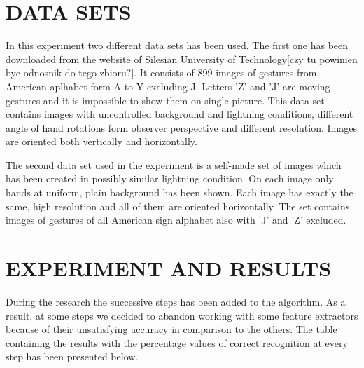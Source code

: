 \documentclass[11pt,a4paper]{article}
\begin{document}
\section{DATA SETS}

	In this experiment two different data sets has been used. The first one has been downloaded from the website of Silesian University of Technology[czy tu powinien byc odnosnik do tego zbioru?]. It consists of 899 images of gestures from American aplhabet form A to Y excluding J. Letters 'Z' and 'J' are moving gestures and it is impossible to show them on single picture. This data set contains images with uncontrolled background and lightning conditions, different angle of hand rotations form observer perspective and different resolution. Images are oriented both vertically and horizontally.
	
	The second data set used in the experiment is a self-made set of images which has been created in possibly similar lightning condition. On each image only hands at uniform, plain background has been shown. Each image has exactly the same, high resolution and all of them are oriented horizontally. The set contains images of gestures of all American sign alphabet also with 'J' and 'Z' excluded.



\section{EXPERIMENT AND RESULTS}

During the research the successive steps has been added to the algorithm. As a result, at some steps we decided to abandon working with some feature extractors because of their unsatisfying accuracy in comparison to the others. The table containing the results with the percentage values of correct recognition at every step has been presented below.
\end{document}
